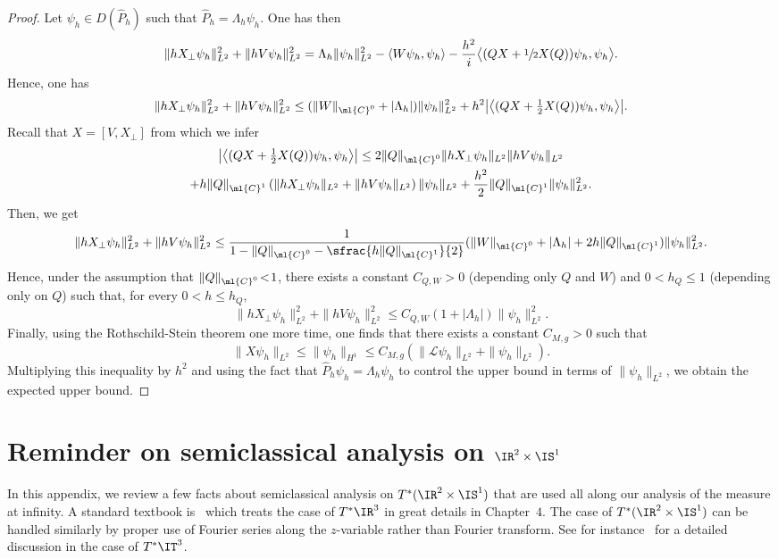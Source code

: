 \documentclass[JEP,XML,SOM,Unicode, NoEqCountersInSection,published]{cedram}
\theoremstyle{plain}
\theoremstyle{definition}
\theoremstyle{remark}
\begin{document}
\begin{proof} Let $\psi_h\in D(\widehat{P}_h)$ such that $\widehat{P}_h=\Lambda_h\psi_h$. One has then
\[
\|hX_\perp\psi_h\|_{L^2}^2+\|hV\psi_h\|_{L^2}^2=\Lambda_h\|\psi_h\|_{L^2}^2-\langle W\psi_h,\psi_h\rangle-\frac{h^2}{i}\bigl\langle(QX+\sfrac{1}{2}X(Q))\psi_h,\psi_h\bigr\rangle.
\]
Hence, one has
\[
\|hX_\perp\psi_h\|_{L^2}^2+\|hV\psi_h\|_{L^2}^2\leq (\|W\|_{\ml{C}^0}+|\Lambda_h|)\|\psi_h\|_{L^2}^2+h^2\bigl|\bigl\langle(QX+\tfrac{1}{2}X(Q))\psi_h,\psi_h\bigr\rangle\bigr|.
\]
Recall that $X=[V,X_\perp]$ from which we infer
\begin{multline*}
\bigl|\bigl\langle(QX+\tfrac{1}{2}X(Q))\psi_h,\psi_h\bigr\rangle\bigr|\leq 2\|Q\|_{\ml{C}^0}\|hX_\perp\psi_h\|_{L^2}\|hV\psi_h\|_{L^2}\\
+ h\|Q\|_{\ml{C}^1}\left(\|hX_\perp\psi_h\|_{L^2}+ \|hV\psi_h\|_{L^2}\right)\|\psi_h\|_{L^2}
+ \frac{h^2}{2}\|Q\|_{\ml{C}^1}\|\psi_h\|_{L^2}^2.\end{multline*}
Then, we get
\[
\|hX_\perp\psi_h\|_{L^2}^2+\|hV\psi_h\|_{L^2}^2\leq \frac{1}{1-\|Q\|_{\ml{C}^0}-\sfrac{h\|Q\|_{\ml{C}^1}}{2}}(\|W\|_{\ml{C}^0}+|\Lambda_h|+2h\|Q\|_{\ml{C}^1})\|\psi_h\|_{L^2}^2.
\]
Hence, under the assumption that $\|Q\|_{\ml{C}^0}\!<\!1$, there exists a constant $C_{Q,W}\!>\!0$ (depend\-ing only $Q$ and $W$) and $0<h_Q\leq 1$ (depending only on $Q$) such that, for every $0<h\leq h_Q$,
\begin{equation}\label{e:bound-apriori-proof}\|hX_\perp\psi_h\|_{L^2}^2+\|hV\psi_h\|_{L^2}^2\leq C_{Q,W}(1+|\Lambda_h|)\|\psi_h\|_{L^2}^2.\end{equation}
Finally, using the Rothschild-Stein theorem one more time, one finds that there exists a constant $C_{M,g}>0$ such that
\[
\|X\psi_h\|_{L^2}\leq \|\psi_h \|_{H^1}\leq C_{M,g}\left(\|\mathcal{L}\psi_h\|_{L^2}+\|\psi_h\|_{L^2}\right).
\]
Multiplying this inequality by $h^2$ and using the fact that $\widehat{P}_h\psi_h=\Lambda_h\psi_h$ to control the upper bound in terms of $\|\psi_h\|_{L^2}$, we obtain the expected upper bound.
\end{proof}

\section{Reminder on semiclassical analysis on \texorpdfstring{$\IR^2\times\IS^1$}{RS}}\label{a:pdo}

In this appendix, we review a few facts about semiclassical analysis on $T^*(\IR^2\times\IS^1)$ that are used all along our analysis of the measure at infinity. A standard textbook is~\cite{Zworski12} which treats the case of $T^*\IR^3$ in great details in Chapter~$4$. The case of $T^*(\IR^2\times\IS^1)$ can be handled similarly by proper use of Fourier series along the $z$\nobreakdash-variable rather than Fourier transform. See for instance~\cite[\S 5.3]{Zworski12} for a detailed discussion in the case of $T^*\IT^3$.
\end{document}
